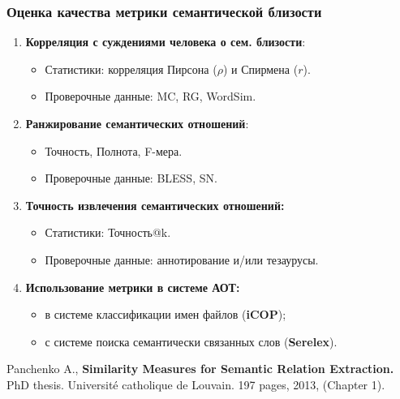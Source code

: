 \begin{frame}
\frametitle{Оценка качества метрики семантической близости}

\begin{enumerate}
\item \textbf{Корреляция с суждениями человека о сем. близости}:
\begin{itemize}
  \item Статистики: корреляция Пирсона ($\rho$) и Спирмена ($r$).
  \item Проверочные данные: MC, RG, WordSim.
\end{itemize}

\item \textbf{Ранжирование семантических отношений}:
\begin{itemize}
  \item Точность, Полнота, F-мера.
  \item Проверочные данные: BLESS, SN.
\end{itemize}


\item \textbf{Точность извлечения семантических отношений:}
\begin{itemize}
  \item Статистики: Точность@k.
  \item Проверочные данные: аннотирование и/или тезаурусы.
\end{itemize}

\item \textbf{Использование метрики в системе АОТ:}
\begin{itemize}
\item в системе классификации имен файлов (\textbf{iCOP});
\item с системе поиска семантически связанных слов (\textbf{Serelex}).
\end{itemize}
\end{enumerate}


Panchenko A., \textbf{Similarity Measures for Semantic Relation Extraction.} PhD thesis. Universit\'{e} catholique de Louvain. 197 pages, 2013, (Chapter 1). 

\end{frame}








